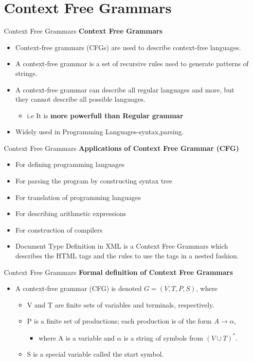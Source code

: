 \documentclass{beamer}
\begin{document}
\section{Context Free Grammars}
\begin{frame}{Context Free Grammars}
	\textbf{Context Free Grammars}
	\begin{itemize}
		\item Context-free grammars (CFGs) are used to describe context-free languages.
		\item A context-free grammar is a set of recursive rules used to generate patterns of strings.
		\item A context-free grammar can describe all regular languages and more, but they cannot describe all possible languages.
		\begin{itemize}
			\item i.e It is\textbf{ more powerfull than Regular grammar }
		\end{itemize}
	\item Widely used in Programming Languages-syntax,parsing.
	\end{itemize}
\end{frame}
\begin{frame}{Context Free Grammars}
\textbf{Applications of Context Free Grammar (CFG)}
\begin{itemize}
	\item For defining programming languages
	\item For parsing the program by constructing syntax tree
	\item For translation of programming languages
	\item For describing arithmetic expressions
	\item For construction of compilers
	\item Document Type Definition in XML is a Context Free Grammars which describes the HTML tags and the rules to use the tags in a nested fashion.
\end{itemize}
\end{frame}
\begin{frame}{Context Free Grammars}
	\textbf{ Formal definition of Context Free Grammars}
	\begin{itemize}
		\item A context-free grammar (CFG) is denoted $G = (V, T, P, S)$, 
		where
		\begin{itemize}
			\item V and T are finite sets of variables and terminals, respectively.
			\item P is a finite set of productions; each production is of the form $A \rightarrow \alpha$,
			\begin{itemize}
				\item where A is a variable and $\alpha$ is a string of symbols from $(V \cup T)^*$.
			\end{itemize} 
			\item S is a special variable called the start symbol.
		\end{itemize}
	\end{itemize}
\end{frame}
\end{document}
